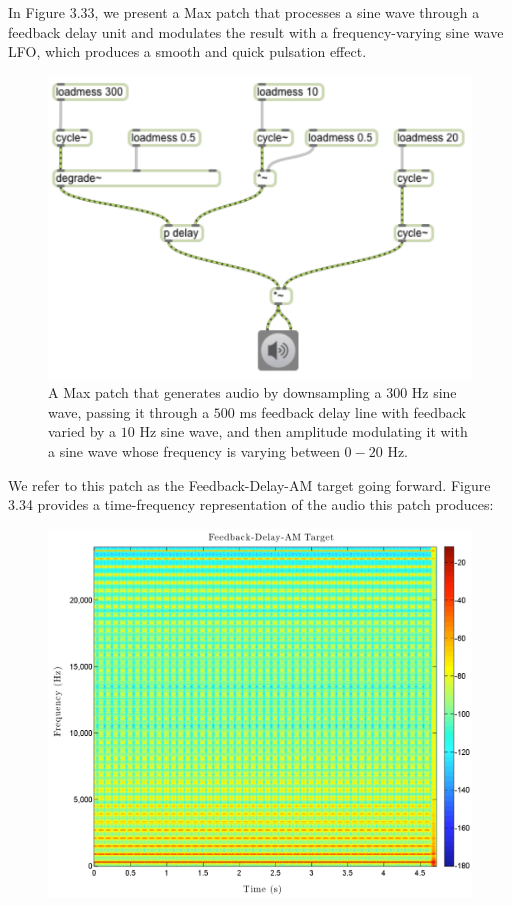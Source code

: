 \documentclass[a4paper,12pt]{report} 	%
\numberwithin{figure}{chapter}
\numberwithin{table}{chapter}
\numberwithin{equation}{chapter}
\begin{document}
\begin{flushleft}
In Figure 3.33, we present a Max patch that processes a sine wave through a feedback delay unit and modulates the result with a frequency-varying sine wave LFO, which produces a smooth and quick pulsation effect. 
\begin{figure}[h!]
\begin{center}
\includegraphics[scale=0.8]{DelayFeedbackAM}
\caption[Delay Feedback AM Max Patch]{A Max patch that generates audio by downsampling a $300$ Hz sine wave, passing it through a $500$ ms feedback delay line with feedback varied by a $10$ Hz sine wave, and then amplitude modulating it with a sine wave whose frequency is varying between $0 - 20$ Hz.}
\end{center}
\end{figure}
We refer to this patch as the Feedback-Delay-AM target going forward. Figure 3.34 provides a time-frequency representation of the audio this patch produces:
\begin{figure}[h!]
\begin{center}
\includegraphics[scale=0.35,width=\linewidth]{FeedbackDelayAMTarget}

\end{center}
\end{figure}
\end{flushleft}
\end{document}
